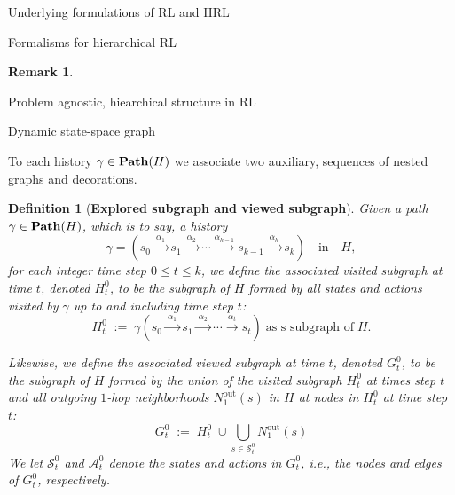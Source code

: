 \documentclass[11pt]{article}
\newtheorem{definition}[subsubsection]{Definition}
\newtheorem{remark}[subsubsection]{Remark}
\begin{document}
\begin{section}{Underlying formulations of RL and HRL}
\begin{subsection}{Formalisms for hierarchical RL}
\begin{remark}
\end{remark}

\end{subsection}

\end{section}


\begin{section}{Problem agnostic, hiearchical structure in RL}

\begin{subsection}{Dynamic state-space graph}

To each history $\gamma\in\bold{Path}(H)$ we associate two auxiliary, sequences of nested graphs and decorations.

\begin{definition}[{\bf Explored subgraph and viewed subgraph}]
\normalfont
Given a path $\gamma\in\bold{Path}(H)$, which is to say, a history
\begin{equation}\label{eq: gamma history}
\gamma=\left(s_{0}\xrightarrow{\ \alpha_{1}\ }s_{1}\xrightarrow{\ \alpha_{2}\ }\cdots\xrightarrow{\alpha_{k-1}}s_{k-1}\xrightarrow{\ \alpha_{k}\ }s_{k}\right)\quad\text{in}\quad H,
\end{equation}
for each integer time step $0\le t\le k$, we define the associated {\em visited subgraph at time $t$}, denoted $H^{0}_{t}$, to be the subgraph of $H$ formed by all states and actions visited by $\gamma$ up to and including time step $t$:
$$
H^{0}_{t}\;:=\;\gamma\left(s_{0}\xrightarrow{\ \alpha_{1}\ }s_{1}\xrightarrow{\ \alpha_{2}\ }\cdots\xrightarrow{\ \alpha_{t}\ }s_{t}\right)\;\text{as s subgraph of}\;H.
$$

Likewise, we define the associated {\em viewed subgraph at time $t$}, denoted $G^{0}_{t}$, to be the subgraph of $H$ formed by the union of the visited subgraph $H^{0}_{t}$ at times step $t$ and all outgoing $1$-hop neighborhoods $N^{\text{out}\!}_{1}(s)$ in $H$ at nodes in $H^{0}_{t}$ at time step $t$:
$$
G^{0}_{t}
\;:=\;
H^{0}_{t}\;\cup\bigcup_{s\in \mathcal{S}^{0}_{t}}
\!\!N^{\text{out}\!}_{1}(s)
$$
We let $\mathcal{S}^{0}_{t}$ and $\mathcal{A}^{0}_{t}$ denote the states and actions in $G^{0}_{t}$, i.e., the nodes and edges of $G^{0}_{t}$, respectively.
\end{definition}


\end{subsection}
\end{section}
\end{document}
